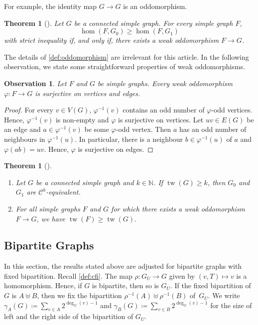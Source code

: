\documentclass[11pt, DIV=15]{scrarticle}
\theoremstyle{definition}
\theoremstyle{plain}
\newtheorem{theorem}[definition]{Theorem}
\newtheorem{observation}[definition]{Observation}
\theoremstyle{remark}
\DeclareMathOperator{\tw}{tw}
\renewcommand{\phi}{\varphi}
\begin{document}
	For example, the identity map $G \to G$ is an oddomorphism.
	
	\begin{theorem}[{\cite[Theorem~3.13]{roberson_oddomorphisms_2022}}]\label{thm:rob3.13}
		Let $G$ be a connected simple graph.
		For every simple graph $F$,
		\[
			\hom(F, G_0) \geq \hom(F, G_1)
		\]
		with strict inequality if, and only if, there exists a weak oddomorphism $F \to G$.
	\end{theorem}

	The details of \cref{def:oddomorphism} are irrelevant for this article.
	In the following observation, we state some straightforward properties of weak oddomorphisms.
	\begin{observation} \label{obs:oddo-surjective}
		Let $F$ and $G$ be simple graphs. Every weak oddomorphism $\phi \colon F\to G$ is surjective on vertices and edges.
	\end{observation}
	\begin{proof}
		For every $v \in V(G)$, $\phi^{-1}(v)$ contains an odd number of $\phi$-odd vertices. Hence, $\phi^{-1}(v)$ is non-empty and $\phi$ is surjective on vertices.
		Let $uv \in E(G)$ be an edge and $a \in \phi^{-1}(v)$ be some $\phi$-odd vertex. 
		Then $a$ has an odd number of neighbours in $\phi^{-1}(u)$.
		In particular, there is a neighbour $b \in
                \phi^{-1}(u)$ of $a$ and $\phi(ab) = uv$.
		Hence, $\phi$ is surjective on edges.
	\end{proof}
	
	\begin{theorem}[{\cite[Lemma~12, Corollary~13]{neuen_homomorphism-distinguishing_2024}}]\label{thm:neuen}
		\begin{enumerate}
			\item Let $G$ be a connected simple graph and $k \in \mathbb{N}$.
			If $\tw(G) \geq k$, then $G_0$ and $G_1$ are $\mathcal{C}^k$-equivalent.
			\item For all simple graphs $F$ and $G$ for
                          which there exists a weak oddomorphism $F
                          \to G$, we have $\tw(F) \geq \tw(G)$.
		\end{enumerate}
	\end{theorem}

	\subsection{Bipartite  Graphs}
	
	In this section, the results stated above are adjusted for bipartite graphs with fixed bipartition.
	Recall \cref{def:cfi}.
	The map $\rho \colon G_U \to G$ given by $(v, T) \mapsto v$ is a homomorphism.
	Hence, if $G$ is bipartite,
	then so is $G_U$.
	If the fixed bipartition of $G$ is $A \uplus B$,
	then we fix the bipartition $\rho^{-1}(A) \uplus \rho^{-1}(B)$ of~$G_U$.
	We write $\gamma_A(G) \coloneqq \sum_{v\in A}2^{\deg_G(v) -1}$ and $\gamma_B(G) \coloneqq \sum_{v\in B}2^{\deg_G(v) -1}$ for the size of left and the right side of the bipartition of $G_U$.
	
\end{document}
